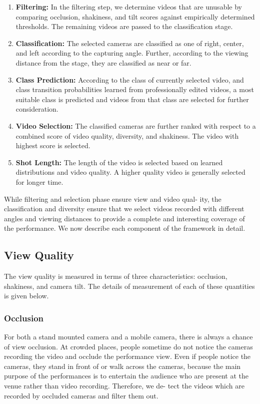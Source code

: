 \documentclass{new}
\begin{document}
\begin{enumerate}
\item \textbf{Filtering:} In the filtering step, we determine videos that are
unusable by comparing occlusion, shakiness, and tilt scores
against empirically determined thresholds. The remaining
videos are passed to the classification stage.

\item \textbf{Classification:} The selected cameras are classified as one
of right, center, and left according to the capturing angle.
Further, according to the viewing distance from the stage,
they are classified as near or far.

\item \textbf{Class Prediction:} According to the class of currently selected video, and class transition probabilities learned from
professionally edited videos, a most suitable class is predicted and videos from that class are selected for further consideration.  

\item \textbf{Video Selection:} The classified cameras are further ranked
with respect to a combined score of video quality, diversity,
and shakiness. The video with highest score is selected.

\item \textbf{Shot Length:} The length of the video is selected based on
learned distributions and video quality. A higher quality video
is generally selected for longer time.

\end{enumerate}

While filtering and selection phase ensure view and video qual-
ity, the classification and diversity ensure that we select videos
recorded with different angles and viewing distances to provide a
complete and interesting coverage of the performance. We now
describe each component of the framework in detail.


\subsection{View Quality}
The view quality is measured in terms of three characteristics:
occlusion, shakiness, and camera tilt. The details of measurement
of each of these quantities is given below.

\subsubsection{Occlusion}
For both a stand mounted camera and a mobile camera, there
is always a chance of view occlusion. At crowded places, people
sometime do not notice the cameras recording the video and occlude the performance view. Even if people notice the cameras,
they stand in front of or walk across the cameras, because the main
purpose of the performances is to entertain the audience who are
present at the venue rather than video recording. Therefore, we de-
tect the videos which are recorded by occluded cameras and filter
them out.
\end{document}
